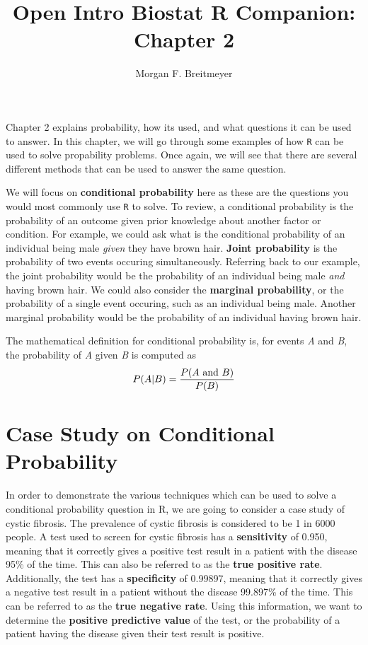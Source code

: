 \documentclass[11pt]{article}\usepackage[]{graphicx}\usepackage[]{color}
\title{Open Intro Biostat R Companion: \\ Chapter 2}
\author{Morgan F. Breitmeyer}
\date{}
\begin{document}
 
\maketitle
 
\tableofcontents
\vspace{1cm}

Chapter 2 explains probability, how its used, and what questions it can be used to answer.  In this chapter, we will go through some examples of how \texttt{R} can be used to solve propability problems.  Once again, we will see that there are several different methods that can be used to answer the same question.  

We will focus on \textbf{conditional probability} here as these are the questions you would most commonly use \texttt{R} to solve.  To review, a conditional probability is the probability of an outcome given prior knowledge about another factor or condition.  For example, we could ask what is the conditional probability of an individual being male \textit{given} they have brown hair.  \textbf{Joint probability} is the probability of two events occuring simultaneously.  Referring back to our example, the joint probability would be the probability of an individual being male \textit{and} having brown hair.  We could also consider the \textbf{marginal probability}, or the probability of a single event occuring, such as an individual being male.  Another marginal probability would be the probability of an individual having brown hair.  

The mathematical definition for conditional probability is, for events \textit{A} and \textit{B}, the probability of \textit{A} given \textit{B} is computed as 
$$ P(A|B) = \frac{P(A \textnormal{ and } B)}{P(B)} $$

\section{Case Study on Conditional Probability}
In order to demonstrate the various techniques which can be used to solve a conditional probability question in R, we are going to consider a case study of cystic fibrosis.  The prevalence of cystic fibrosis is considered to be 1 in 6000 people.  A test used to screen for cystic fibrosis has a \textbf{sensitivity} of 0.950, meaning that it correctly gives a positive test result in a patient with the disease 95\% of the time.  This can also be referred to as the \textbf{true positive rate}.  Additionally, the test has a \textbf{specificity} of 0.99897, meaning that it correctly gives a negative test result in a patient without the disease 99.897\% of the time.  This can be referred to as the \textbf{true negative rate}.  Using this information, we want to determine the \textbf{positive predictive value} of the test, or the probability of a patient having the disease given their test result is positive.  
\end{document}
